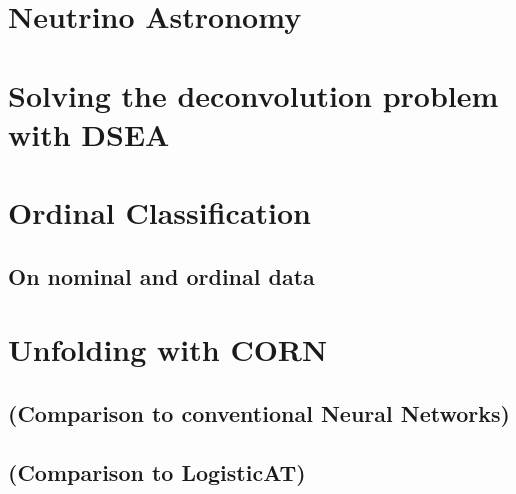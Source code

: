 
\chapter{Neutrino Astronomy}
  
  
\chapter{Solving the deconvolution problem with DSEA}
  
  
\chapter{Ordinal Classification}
  \section{On nominal and ordinal data}
  \blindtext[3]
  
\chapter{Unfolding with CORN}
  
  
  
  
  
  \section{(Comparison to conventional Neural Networks)}
  \section{(Comparison to LogisticAT)}

